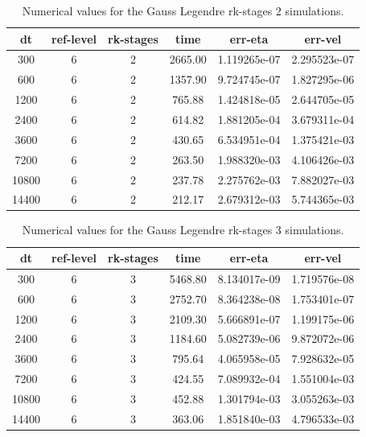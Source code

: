 \documentclass[a4paper, 12pt]{article}
\begin{document}
\begin{table}[h]\centering
\begin{tabular}{c|c|c|c|c|c}
dt    & ref-level &  rk-stages & time    & err-eta      &    err-vel \\ \hline
300    &      6    &      2 & 2665.00 & 1.119265e-07 & 2.295523e-07 \\
600    &      6   &       2 & 1357.90 & 9.724745e-07 & 1.827295e-06\\
1200   &       6   &       2  & 765.88 & 1.424818e-05 & 2.644705e-05\\
2400    &      6   &       2 &  614.82 & 1.881205e-04 & 3.679311e-04\\
3600    &      6   &       2 &  430.65 & 6.534951e-04 & 1.375421e-03\\
7200    &      6    &      2  & 263.50 & 1.988320e-03 & 4.106426e-03\\
10800    &      6   &       2 &  237.78 & 2.275762e-03 & 7.882027e-03\\
14400    &      6   &       2 &  212.17 & 2.679312e-03 & 5.744365e-03\\
\end{tabular}
\caption{Numerical values for the Gauss Legendre rk-stages 2 simulations.}
\end{table}





\begin{table}[h]\centering
\begin{tabular}{c|c|c|c|c|c}
dt    & ref-level &  rk-stages & time    & err-eta      &    err-vel \\ \hline
300    &       6   &        3  & 5468.80  & 8.134017e-09  & 1.719576e-08 \\
600     &      6    &       3  & 2752.70  & 8.364238e-08  & 1.753401e-07\\
1200     &      6    &       3  & 2109.30  & 5.666891e-07  & 1.199175e-06\\
2400     &      6    &       3  & 1184.60  & 5.082739e-06  & 9.872072e-06\\
3600      &     6     &      3  &  795.64  & 4.065958e-05  & 7.928632e-05\\
7200      &     6      &     3   & 424.55  & 7.089932e-04  & 1.551004e-03\\
10800     &      6     &      3  &  452.88  & 1.301794e-03  & 3.055263e-03\\
14400      &     6     &      3   & 363.06   &1.851840e-03  & 4.796533e-03\\
\end{tabular}
\caption{Numerical values for the Gauss Legendre rk-stages 3 simulations.}
\end{table}
\end{document}
